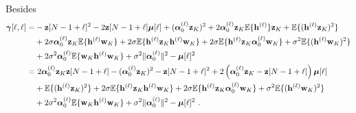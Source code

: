Besides
\begin{align*}
\bgamma[\ell,\ell] =& -\bz[N-1+\ell]^2 -2\bz[N-1+\ell]\bmu[\ell] +(\balpha_0^{(\ell)}\bz_K)^2 +2\balpha_0^{(\ell)}\bz_K\EE\{\bh^{(\ell)}\}\bz_K+ \EE\{(\bh^{(\ell)}\bz_K)^2\}  \\
&+ 2\sigma\balpha_0^{(\ell)}\bz_K\EE\{\bh^{(\ell)}\bw_K\} + 2\sigma\EE\{\bh^{(\ell)}\bz_K\bh^{(\ell)}\bw_K\} + 2\sigma\EE\{\bh^{(\ell)}\bz_K\balpha_0^{(\ell)}\bw_K\} + \sigma^2\EE\{(\bh^{(\ell)}\bw_K)^2\} \\
&+ 2\sigma^2\balpha_0^{(\ell)}\EE\{\bw_K\bh^{(\ell)}\bw_K\} + \sigma^2\|\balpha_0^{(\ell)}\|^2  - \bmu[\ell]^2\\
=&\ 2\balpha_0^{(\ell)}\bz_K\bz[N-1+\ell] -(\balpha_0^{(\ell)}\bz_K)^2-\bz[N-1+\ell]^2 +2\left(\balpha_0^{(\ell)}\bz_K-\bz[N-1+\ell]\right)\bmu[\ell] \\
& +\EE\{(\bh^{(\ell)}\bz_K)^2\} + 2\sigma\EE\{\bh^{(\ell)}\bz_K\bh^{(\ell)}\bw_K\} + 2\sigma\EE\{\bh^{(\ell)}\bz_K\balpha_0^{(\ell)}\bw_K\} + \sigma^2\EE\{(\bh^{(\ell)}\bw_K)^2\} \\
&+ 2\sigma^2\balpha_0^{(\ell)}\EE\{\bw_K\bh^{(\ell)}\bw_K\} + \sigma^2\|\balpha_0^{(\ell)}\|^2 - \bmu[\ell]^2\ .
\end{align*}

